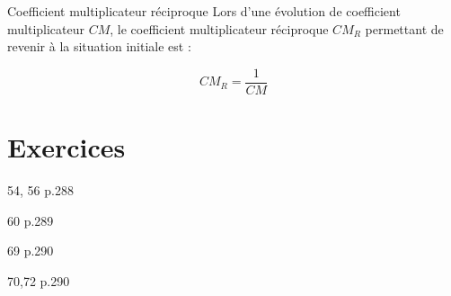 \documentclass[10pt,a4paper,openany,twoside, prof]{book}
\begin{document}
\begin{prop}{Coefficient multiplicateur réciproque}{}
	Lors d'une évolution de coefficient multiplicateur $CM$, le coefficient multiplicateur réciproque $CM_R$ permettant de revenir à la situation initiale est :

	$$CM_R = \frac{1}{CM}$$

\end{prop}

\section*{Exercices}
\begin{exercicesnofoot}
	\begin{bookexos}{54, 56 p.288}\end{bookexos}
	\begin{bookexo}{60 p.289}\end{bookexo}
	\begin{bookexo}{69 p.290}\end{bookexo}
	\begin{bookexos}{70,72 p.290}\end{bookexos}
\end{exercicesnofoot}
\end{document}
